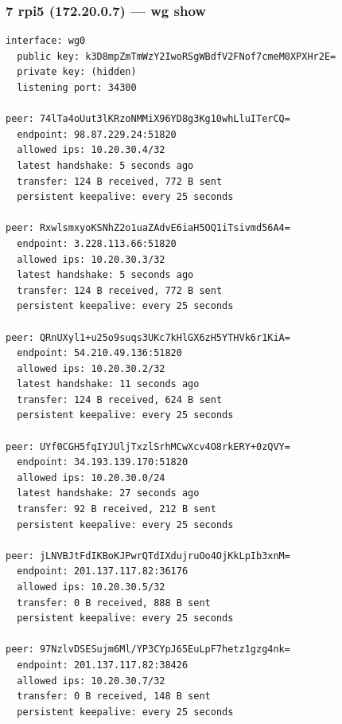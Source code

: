 \documentclass[11pt,a4paper]{article}
\begin{document}
\subsubsection*{7 rpi5 (172.20.0.7) — wg show}
\begin{lstlisting}
interface: wg0
  public key: k3D8mpZmTmWzY2IwoRSgWBdfV2FNof7cmeM0XPXHr2E=
  private key: (hidden)
  listening port: 34300

peer: 74lTa4oUut3lKRzoNMMiX96YD8g3Kg10whLluITerCQ=
  endpoint: 98.87.229.24:51820
  allowed ips: 10.20.30.4/32
  latest handshake: 5 seconds ago
  transfer: 124 B received, 772 B sent
  persistent keepalive: every 25 seconds

peer: RxwlsmxyoKSNhZ2o1uaZAdvE6iaH5OQ1iTsivmd56A4=
  endpoint: 3.228.113.66:51820
  allowed ips: 10.20.30.3/32
  latest handshake: 5 seconds ago
  transfer: 124 B received, 772 B sent
  persistent keepalive: every 25 seconds

peer: QRnUXyl1+u25o9suqs3UKc7kHlGX6zH5YTHVk6r1KiA=
  endpoint: 54.210.49.136:51820
  allowed ips: 10.20.30.2/32
  latest handshake: 11 seconds ago
  transfer: 124 B received, 624 B sent
  persistent keepalive: every 25 seconds

peer: UYf0CGH5fqIYJUljTxzlSrhMCwXcv4O8rkERY+0zQVY=
  endpoint: 34.193.139.170:51820
  allowed ips: 10.20.30.0/24
  latest handshake: 27 seconds ago
  transfer: 92 B received, 212 B sent
  persistent keepalive: every 25 seconds

peer: jLNVBJtFdIKBoKJPwrQTdIXdujruOo4OjKkLpIb3xnM=
  endpoint: 201.137.117.82:36176
  allowed ips: 10.20.30.5/32
  transfer: 0 B received, 888 B sent
  persistent keepalive: every 25 seconds

peer: 97NzlvDSESujm6Ml/YP3CYpJ65EuLpF7hetz1gzg4nk=
  endpoint: 201.137.117.82:38426
  allowed ips: 10.20.30.7/32
  transfer: 0 B received, 148 B sent
  persistent keepalive: every 25 seconds

\end{lstlisting}
\end{document}
